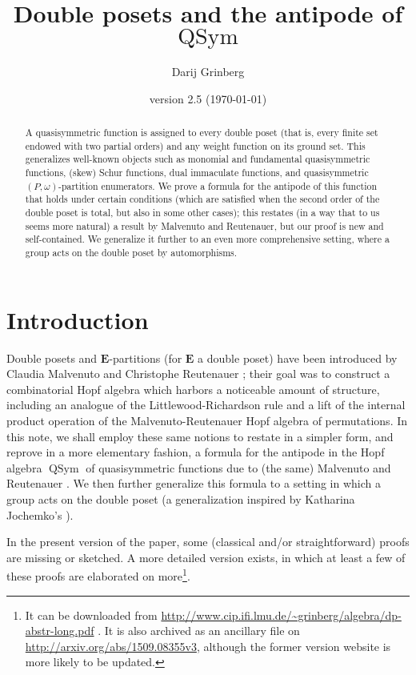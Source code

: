 \documentclass[numbers=enddot,12pt,final,onecolumn,notitlepage,abstracton]{scrartcl}%
\theoremstyle{definition}
\newcommand{\QSym}{{\operatorname{QSym}}}
\newcommand{\EE}{{\mathbf{E}}}
\begin{document}
\author{Darij Grinberg}

\title{Double posets and the antipode of $\QSym$}

\date{version 2.5 (\today)}

\maketitle

\begin{abstract}
A quasisymmetric function is assigned to every double poset (that is,
every finite set endowed with two partial orders) and any weight function
on its ground set. This generalizes well-known objects such as monomial
and fundamental quasisymmetric functions, (skew) Schur functions, dual
immaculate functions, and quasisymmetric
$\left(P, \omega\right)$-partition enumerators.
We prove a formula for the antipode of this function that
holds under certain conditions (which are satisfied when the second order
of the double poset is total, but also in some other cases); this
restates (in a way that to us seems more natural) a
result by Malvenuto and Reutenauer, but our proof is new and
self-contained. We generalize it further to an even more comprehensive
setting, where a group acts on the double poset by automorphisms.
\end{abstract}

\section{Introduction}
\label{sec:in}

Double posets and $\EE$-partitions (for $\EE$ a double poset)
have been introduced by Claudia Malvenuto and Christophe
Reutenauer \cite{Mal-Reu-DP}; their goal was to construct a
combinatorial Hopf algebra which harbors a noticeable amount of
structure, including an analogue of the Littlewood-Richardson
rule and a lift of the internal product operation of the
Malvenuto-Reutenauer Hopf algebra of permutations. In this note,
we shall employ these same notions to restate in a simpler form,
and reprove in a more elementary fashion, a formula for the
antipode in the Hopf algebra $\QSym$ of quasisymmetric functions
due to (the same) Malvenuto and Reutenauer
\cite[Theorem 3.1]{Mal-Reu}. We then further generalize this
formula to a setting in which a group acts on the double poset
(a generalization inspired by Katharina Jochemko's
\cite{Joch}).

In the present version of the paper, some (classical and/or
straightforward) proofs are missing or sketched. A more detailed
version exists, in which at least a few of these proofs are
elaborated on more\footnote{It can be downloaded from \newline
\url{http://www.cip.ifi.lmu.de/~grinberg/algebra/dp-abstr-long.pdf} .
It is also archived as an ancillary file on
\url{http://arxiv.org/abs/1509.08355v3}, although the former version
website is more likely to be updated.}.
\end{document}
